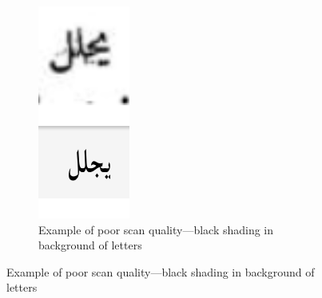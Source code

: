 \begin{figure}[!ht]
\begin{subfigure}[b]{0.9\linewidth}
	\includegraphics[width=\textwidth]{images/image14.png}
	\caption{Example of poor scan quality—black shading in background of letters}
	\label{fig3:fig27}
	\end{subfigure}


\end{figure}
